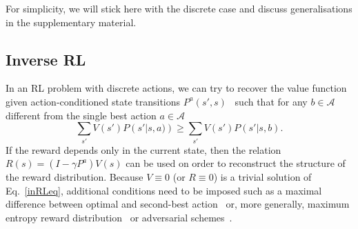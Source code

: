 \documentclass{article}
\begin{document}
%
%
For simplicity, we will stick here with the discrete case and discuss generalisations in the supplementary material.

\subsection{Inverse RL\label{invRL}}

In an RL problem with discrete actions, we can try to recover 
the value function given action-conditioned state transitions $P^a(s',s)$~\cite{ng2000algorithms}
such that for any $b \in \mathcal{A}$ different from the single best action $a \in \mathcal{A}$ 
\begin{equation}
	\sum_{s'} V\left(s'\right) P\left(s'|s,a) \right)
	\ge\sum_{s'} V\left(s'\right) P\left(s'|s,b\right).
	\label{inRLeq}
\end{equation}
If the reward depends only in the current state,
then the relation $R(s)=\left(I-\gamma P^{a}\right)V(s)$ can be used on order to reconstruct 
the structure of the reward distribution. Because $V\equiv 0$ (or $R\equiv 0$) is a trivial 
solution of Eq.~\ref{inRLeq},
additional conditions need to be imposed such as a maximal difference between optimal and second-best action~\cite{ng2000algorithms}  or, more generally, maximum entropy reward 
distribution~\cite{ziebart2008maximum} or adversarial schemes~\cite{pfau2016connecting}. 
\end{document}
